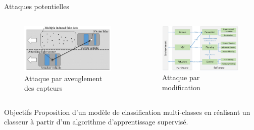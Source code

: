 \documentclass{beamer}
\begin{document}
\begin{frame}{Attaques potentielles}

\begin{columns}

\begin{column}{0.5\textwidth}
\begin{figure}
\centering
\includegraphics[width=\textwidth]{img/blinding.png}
\caption{Attaque par aveuglement des capteurs}
\end{figure}
\end{column}

\begin{column}{0.5\textwidth}
\begin{figure}
\centering
\includegraphics[width=\textwidth]{img/data_flow.png}
\caption{Attaque par modification}
\end{figure}
\end{column}

\end{columns}

\end{frame}


\begin{frame}{Objectifs}
Proposition d'un modèle de classification multi-classes en réalisant un classeur à partir d'un algorithme d'apprentissage supervisé.
\end{frame}
\end{document}
